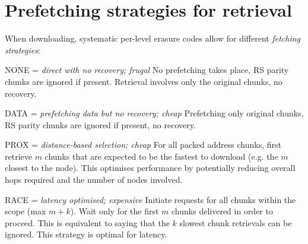 \documentclass[manuscript,screen,review]{acmart}
\begin{document}
\section{Prefetching strategies for retrieval}
\label{sec:strategies}

When downloading, systematic per-level erasure codes allow for different \emph{fetching strategies}:
\begin{labelledlist}
\item[\textsc{NONE} = \emph{direct with no recovery; frugal}] No prefetching takes place, RS parity chunks are ignored if present. Retrieval involves  only the original chunks, no recovery. 
\item[\textsc{DATA} = \emph{prefetching data but no recovery; cheap}] Prefetching only original chunks, RS parity chunks are ignored if present, no recovery.
\item[\textsc{PROX} = \emph{distance-based selection; cheap}] For all packed address chunks, first retrieve $ m$ chunks that are expected to be the fastest to download (e.g. the $m$ closest to the node). This optimises performance by potentially reducing overall hops required and the number of nodes involved.
\item[\textsc{RACE} = \emph{latency optimised; expensive}] Initiate requests for all chunks within the scope (max $m+k$). Wait only for the first $m$ chunks delivered in order to proceed. This is equivalent to saying that the $k$ slowest chunk retrievals can be ignored. This strategy is optimal for latency.
\end{labelledlist}

%
%
%
%
%
%
\end{document}
